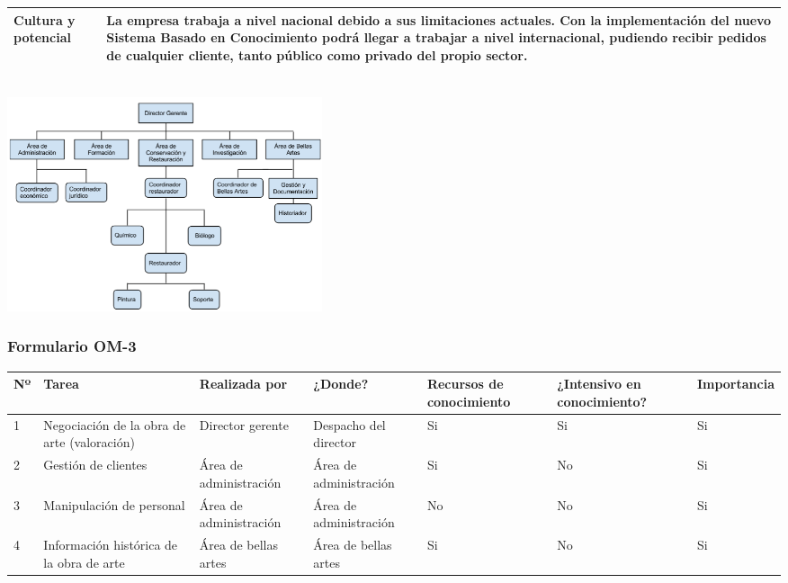 \documentclass[a4paper,11pt]{article}
\begin{document}
\begin{center}
\begin{tabular}{| p{2.5cm} | p{9cm} |}
					\hline
					\cellcolor[RGB]{224,233,250}\textbf{Cultura y potencial} & La empresa
					trabaja a nivel nacional debido a sus limitaciones actuales. Con la implementación del nuevo Sistema Basado en Conocimiento podrá llegar a trabajar a nivel internacional, pudiendo recibir pedidos de cualquier cliente, tanto público como privado del propio sector.\\
					\hline
				\end{tabular}\\
				\newpage
				\includegraphics[width=350px]{organigrama.png} \\
			\end{center}
			\newpage
			\begin{landscape}
			\subsubsection{Formulario OM-3}
			\begin{center}
				\begin{tabular}{| l | p{4cm} | p{2.8cm} | p{2cm} | p{2cm} | p{3cm} |
				p{2.2cm} |}
					\hline
					\cellcolor[RGB]{224,233,250}\textbf{Nº} &
					\cellcolor[RGB]{224,233,250}\textbf{Tarea} &
					\cellcolor[RGB]{224,233,250}\textbf{Realizada por} &
					\cellcolor[RGB]{224,233,250}\textbf{¿Donde?} &
					\cellcolor[RGB]{224,233,250}\textbf{Recursos de conocimiento} &
					\cellcolor[RGB]{224,233,250}\textbf{¿Intensivo en conocimiento?} &
					\cellcolor[RGB]{224,233,250}\textbf{Importancia}\\
					\hline
					1 & Negociación de la obra de arte (valoración) & Director gerente &
					Despacho del director & Si & Si & Si\\
					\hline
					2 & Gestión de clientes & Área de administración & Área de administración
					& Si & No & Si\\
					\hline
					3 & Manipulación de personal & Área de administración & Área de
					administración & No & No & Si\\
					\hline
					4 & Información histórica de la obra de arte & Área de bellas artes & Área
					de bellas artes & Si & No & Si\\
					\hline
				\end{tabular}
			\end{center}
			\end{landscape}
\end{document}
